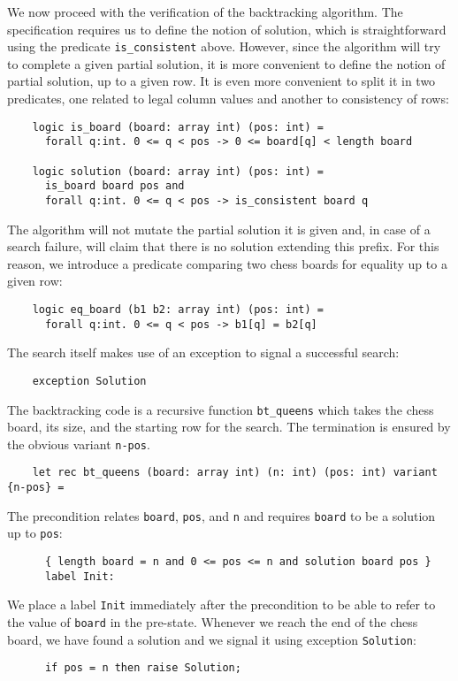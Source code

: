 We now proceed with the verification of the backtracking algorithm.
The specification requires us to define the notion of solution, which
is straightforward using the predicate \verb|is_consistent| above.
However, since the algorithm will try to complete a given partial
solution, it is more convenient to define the notion of partial
solution, up to a given row. It is even more convenient to split it in
two predicates, one related to legal column values and another to
consistency of rows:
\begin{verbatim}
    logic is_board (board: array int) (pos: int) =
      forall q:int. 0 <= q < pos -> 0 <= board[q] < length board

    logic solution (board: array int) (pos: int) =
      is_board board pos and
      forall q:int. 0 <= q < pos -> is_consistent board q
\end{verbatim}
The algorithm will not mutate the partial solution it is given and,
in case of a search failure, will claim that there is no solution
extending this prefix. For this reason, we introduce a predicate
comparing two chess boards for equality up to a given row:
\begin{verbatim}
    logic eq_board (b1 b2: array int) (pos: int) =
      forall q:int. 0 <= q < pos -> b1[q] = b2[q]
\end{verbatim}
The search itself makes use of an exception to signal a successful search:
\begin{verbatim}
    exception Solution
\end{verbatim}
The backtracking code is a recursive function \verb|bt_queens| which
takes the chess board, its size, and the starting row for the search.
The termination is ensured by the obvious variant \texttt{n-pos}.
\begin{verbatim}
    let rec bt_queens (board: array int) (n: int) (pos: int) variant {n-pos} =
\end{verbatim}
The precondition relates \texttt{board}, \texttt{pos}, and \texttt{n}
and requires \texttt{board} to be a solution up to \texttt{pos}:
\begin{verbatim}
      { length board = n and 0 <= pos <= n and solution board pos }
      label Init:
\end{verbatim}
We place a label \texttt{Init} immediately after the precondition to
be able to refer to the value of \texttt{board} in the pre-state.
Whenever we reach the end of the chess board, we have found a solution
and we signal it using exception \texttt{Solution}:
\begin{verbatim}
      if pos = n then raise Solution;
\end{verbatim}
